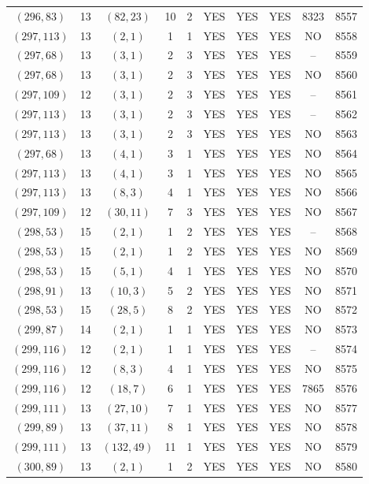 \begin{longtable}{|c|c|c|c|c|c|c|c|c|c|}
$(296, 83)$ & 13 & $(82, 23)$ & 10 & 2 & YES & YES & YES & 8323 & 8557\\
$(297, 113)$ & 13 & $(2, 1)$ & 1 & 1 & YES & YES & YES & NO & 8558\\
$(297, 68)$ & 13 & $(3, 1)$ & 2 & 3 & YES & YES & YES & -- & 8559\\
$(297, 68)$ & 13 & $(3, 1)$ & 2 & 3 & YES & YES & YES & NO & 8560\\
$(297, 109)$ & 12 & $(3, 1)$ & 2 & 3 & YES & YES & YES & -- & 8561\\
$(297, 113)$ & 13 & $(3, 1)$ & 2 & 3 & YES & YES & YES & -- & 8562\\
$(297, 113)$ & 13 & $(3, 1)$ & 2 & 3 & YES & YES & YES & NO & 8563\\
$(297, 68)$ & 13 & $(4, 1)$ & 3 & 1 & YES & YES & YES & NO & 8564\\
$(297, 113)$ & 13 & $(4, 1)$ & 3 & 1 & YES & YES & YES & NO & 8565\\
$(297, 113)$ & 13 & $(8, 3)$ & 4 & 1 & YES & YES & YES & NO & 8566\\
$(297, 109)$ & 12 & $(30, 11)$ & 7 & 3 & YES & YES & YES & NO & 8567\\
$(298, 53)$ & 15 & $(2, 1)$ & 1 & 2 & YES & YES & YES & -- & 8568\\
$(298, 53)$ & 15 & $(2, 1)$ & 1 & 2 & YES & YES & YES & NO & 8569\\
$(298, 53)$ & 15 & $(5, 1)$ & 4 & 1 & YES & YES & YES & NO & 8570\\
$(298, 91)$ & 13 & $(10, 3)$ & 5 & 2 & YES & YES & YES & NO & 8571\\
$(298, 53)$ & 15 & $(28, 5)$ & 8 & 2 & YES & YES & YES & NO & 8572\\
$(299, 87)$ & 14 & $(2, 1)$ & 1 & 1 & YES & YES & YES & NO & 8573\\
$(299, 116)$ & 12 & $(2, 1)$ & 1 & 1 & YES & YES & YES & -- & 8574\\
$(299, 116)$ & 12 & $(8, 3)$ & 4 & 1 & YES & YES & YES & NO & 8575\\
$(299, 116)$ & 12 & $(18, 7)$ & 6 & 1 & YES & YES & YES & 7865 & 8576\\
$(299, 111)$ & 13 & $(27, 10)$ & 7 & 1 & YES & YES & YES & NO & 8577\\
$(299, 89)$ & 13 & $(37, 11)$ & 8 & 1 & YES & YES & YES & NO & 8578\\
$(299, 111)$ & 13 & $(132, 49)$ & 11 & 1 & YES & YES & YES & NO & 8579\\
$(300, 89)$ & 13 & $(2, 1)$ & 1 & 2 & YES & YES & YES & NO & 8580\\

\end{longtable}
